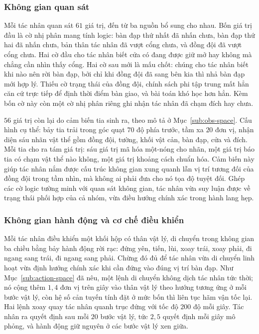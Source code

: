 \subsubsection{Không gian quan sát}
\label{sub:coop-obs}
\indent Mỗi tác nhân quan sát $61$ giá trị, đến từ ba nguồn bổ sung cho nhau. Bốn
giá trị đầu là cờ nhị phân mang tính logic: bàn đạp thứ nhất đã nhấn chưa, bàn đạp thứ hai
đã nhấn chưa, bản thân tác nhân đã vượt cổng chưa, và đồng đội đã vượt cổng chưa. Hai cờ
đầu cho tác nhân biết cửa có đang được giữ mở hay không mà chẳng cần nhìn thấy cổng. Hai
cờ sau mới là mấu chốt: chúng cho tác nhân biết khi nào nên rời bàn đạp, bởi chỉ khi đồng
đội đã sang bên kia thì nhả bàn đạp mới hợp lý. Thiếu cờ trạng thái của đồng đội, chính
sách phi tập trung mất hẳn căn cứ trực tiếp để định thời điểm bàn giao, và bài toán khó
học hơn hẳn. Kèm bốn cờ này còn một cờ nhị phân riêng ghi nhận tác nhân đã chạm đích hay
chưa.

\indent $56$ giá trị còn lại do cảm biến tia sinh ra, theo mô tả ở
Mục~\ref{sub:obs-space}. Cấu hình cụ thể: bảy tia trải trong góc quạt $70$ độ phía trước, tầm
xa $20$ đơn vị, nhận diện sáu nhãn vật thể gồm đồng đội, tường, khối vật
cản, bàn đạp, cửa và đích. Mỗi tia cho ra tám giá trị: sáu giá trị mã hóa một-nóng cho nhãn,
một giá trị báo tia có chạm vật thể nào không, một giá trị khoảng cách chuẩn hóa.
Cảm biến này giúp tác nhân nắm được cấu trúc không gian xung quanh lẫn vị trí tương đối
của đồng đội trong tầm nhìn, mà không ai phải đưa cho nó tọa độ tuyệt đối. Ghép các cờ
logic tường minh với quan sát không gian, tác nhân vừa suy luận được về trạng thái phối
hợp của cả nhóm, vừa điều hướng chính xác trong hành lang hẹp.

\subsubsection{Không gian hành động và cơ chế điều khiển}
\indent Mỗi tác nhân điều khiển một khối hộp có thân vật lý, di chuyển trong không gian ba
chiều bằng bảy hành động rời rạc: đứng yên, tiến, lùi, xoay trái, xoay phải, đi ngang sang
trái, đi ngang sang phải. Chừng đó đủ để tác nhân vừa di chuyển linh hoạt vừa định hướng
chính xác khi cần đứng vào đúng vị trí bàn đạp. Như Mục~\ref{sub:action-space} đã nêu, một
lệnh di chuyển không dịch tác nhân tức thời; nó cộng thêm $1{,}4$ đơn vị trên giây vào
thân vật lý theo hướng tương ứng ở mỗi bước vật lý, còn hệ số cản tuyến tính đặt ở mức bốn
thì liên tục hãm vận tốc lại. Hai lệnh xoay quay tác nhân quanh trục đứng với tốc độ $200$ độ
mỗi giây. Tác nhân ra quyết định sau mỗi $20$ bước vật lý, tức $2{,}5$ quyết định mỗi giây mô
phỏng, và hành động giữ nguyên ở các bước vật lý xen giữa.

